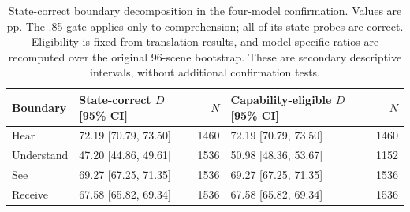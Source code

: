 \begin{table}[t]
\centering\small
\begin{lrbox}{\OCtable}\begin{tabular}{@{}llrlr@{}}
\toprule
Boundary & State-correct $D$ [95\% CI] & $N$ & Capability-eligible $D$ [95\% CI] & $N$\\
\midrule
Hear & 72.19 [70.79, 73.50] & 1460 & 72.19 [70.79, 73.50] & 1460\\
Understand & 47.20 [44.86, 49.61] & 1536 & 50.98 [48.36, 53.67] & 1152\\
See & 69.27 [67.25, 71.35] & 1536 & 69.27 [67.25, 71.35] & 1536\\
Receive & 67.58 [65.82, 69.34] & 1536 & 67.58 [65.82, 69.34] & 1536\\
\bottomrule
\end{tabular}\end{lrbox}
\ifdim\wd\OCtable>\linewidth\PackageError{access-paper}{Table tab:stateboundary exceeds its column}{Revise the table layout.}\fi
\usebox{\OCtable}
\caption{State-correct boundary decomposition in the four-model confirmation. Values are pp. The .85 gate applies only to comprehension; all of its state probes are correct. Eligibility is fixed from translation results, and model-specific ratios are recomputed over the original 96-scene bootstrap. These are secondary descriptive intervals, without additional confirmation tests.}
\label{tab:stateboundary}
\end{table}
